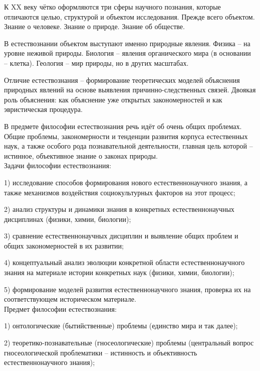 \documentclass[exam_answers.tex]{subfiles}
\begin{document}
\renewcommand{\baselinestretch}{\blch}

 К XX веку чётко оформляются три сферы научного познания, которые отличаются целью, структурой и объектом исследования.
 Прежде всего объектом.
 Знание о человеке.
 Знание о природе.
 Знание об обществе.
 
 В естествознании объектом выступают именно природные явления.
 Физика -- на уровне неживой природы.
 Биология -- явления органического мира (в основании -- клетка).
 Геология -- мир природы, но в других масштабах.

Отличие естествознания -- формирование теоретических моделей объяснения природных явлений на основе выявления причинно-следственных связей.
Двоякая роль объяснения: как объяснение уже открытых закономерностей и как эвристическая процедура.

В предмете философии естествознания речь идёт об очень общих проблемах.
Общие проблемы, закономерности и тенденции развития корпуса естественных наук,
а также особого рода познавательной деятельности, главная цель которой -- истинное, объективное знание о законах природы.
\\

Задачи философии естествознания:

1) исследование способов формирования нового естественнонаучного знания, а также механизмов воздействия социокультурных факторов на этот процесс;

2) анализ структуры и динамики знания в конкретных естественнонаучных дисциплинах (физики, химии, биологии);

3) сравнение естественнонаучных дисциплин и выявление общих проблем и общих закономерностей в их развитии;

4) концептуальный анализ эволюции конкретной области естественнонаучного знания на материале истории конкретных наук (физики, химии, биологии);

5) формирование моделей развития естественнонаучного знания, проверка их на соответствующем историческом материале.
\\

Предмет философии естествознания:

1) онтологические (бытийственные) проблемы (единство мира и так далее);

2) теоретико-познавательные (гносеологические) проблемы (центральный вопрос гносеологической проблематики -- истинность и объективность естественнонаучного знания);
\end{document}
